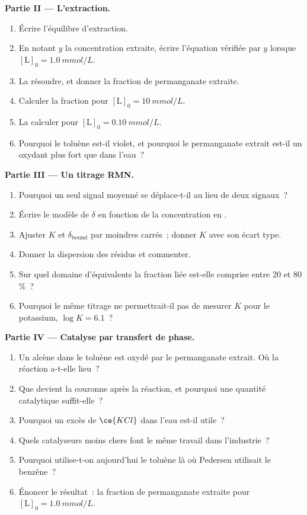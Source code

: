 \begin{problem}
\medskip\noindent\textbf{Partie II --- L'extraction.}
\begin{enumerate}[resume]
  \item Écrire l'équilibre d'extraction.
  \item En notant $y$ la concentration extraite, écrire l'équation vérifiée
        par $y$ lorsque
        $[\mathrm L]_0 = \qty{1.0}{mmol/L}$.
  \item La résoudre, et donner la fraction de permanganate extraite.
  \item Calculer la fraction pour $[\mathrm L]_0 = \qty{10}{mmol/L}$.
  \item La calculer pour $[\mathrm L]_0 = \qty{0.10}{mmol/L}$.
  \item Pourquoi le toluène est-il violet, et pourquoi le permanganate
        extrait est-il un oxydant plus fort que dans l'eau~?
\end{enumerate}

\medskip\noindent\textbf{Partie III --- Un titrage RMN.}
\begin{enumerate}[resume]
  \item Pourquoi un seul signal moyenné se déplace-t-il au lieu de deux
        signaux~?
  \item Écrire le modèle de $\delta$ en fonction de la concentration en .
  \item Ajuster $K$ et $\delta_{\mathrm{bound}}$ par moindres carrés~; donner $K$ avec son écart type.
  \item Donner la dispersion des résidus et commenter.
  \item Sur quel domaine d'équivalents la fraction liée est-elle comprise
        entre 20 et 80\,\%~?
  \item Pourquoi le même titrage ne permettrait-il pas de mesurer $K$ pour le potassium, $\log K = 6.1$~?
\end{enumerate}

\medskip\noindent\textbf{Partie IV --- Catalyse par transfert de phase.}
\begin{enumerate}[resume]
  \item Un alcène dans le toluène est oxydé par le permanganate extrait. Où
        la réaction a-t-elle lieu~?
  \item Que devient la couronne après la réaction, et pourquoi une
        quantité catalytique suffit-elle~?
  \item Pourquoi un excès de $\ce{KCl}$ dans l'eau est-il utile~?
  \item Quels catalyseurs moins chers font le même travail dans
        l'industrie~?
  \item Pourquoi utilise-t-on aujourd'hui le toluène là où Pedersen
        utilisait le benzène~?
  \item Énoncer le résultat~: la fraction de permanganate extraite pour
        $[\mathrm L]_0 = \qty{1.0}{mmol/L}$.
\end{enumerate}
\end{problem}
